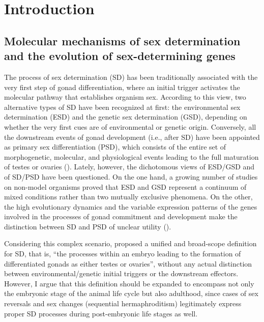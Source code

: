 \documentclass[../main.tex]{subfiles}
\begin{document}
{
\chapter{Introduction}
\label{introduction}
}

\section{Molecular mechanisms of sex determination and the evolution of sex-determining genes}
The process of sex determination (SD) has been traditionally associated with the very first step of gonad differentiation, where an initial trigger activates the molecular pathway that establishes organism sex. According to this view, two alternative types of SD have been recognized at first: the environmental sex determination (ESD) and the genetic sex determination (GSD), depending on whether the very first cues are of environmental or genetic origin. Conversely, all the downstream events of gonad development (i.e., after SD) have been appointed as primary sex differentiation (PSD), which consists of the entire set of morphogenetic, molecular, and physiological events leading to the full maturation of testes or ovaries (\textbf{\cite{uller2011origin, beukeboom2014evolution}}). Lately, however, the dichotomous views of ESD/GSD and of SD/PSD have been questioned. On the one hand, a growing number of studies on non-model organisms proved that ESD and GSD represent a continuum of mixed conditions rather than two mutually exclusive phenomena. On the other, the high evolutionary dynamics and the variable expression patterns of the genes involved in the processes of gonad commitment and development make the distinction between SD and PSD of unclear utility (\textbf{\cite{beukeboom2014evolution}}).

Considering this complex scenario, \textbf{\cite{uller2011origin}} proposed a unified and broad-scope definition for SD, that is, “the processes within an embryo leading to the formation of differentiated gonads as either testes or ovaries”, without any actual distinction between environmental/genetic initial triggers or the downstream effectors. However, I argue that this definition should be expanded to encompass not only the embryonic stage of the animal life cycle but also adulthood, since cases of sex reversals and sex changes (sequential hermaphroditism) legitimately express proper SD processes during post-embryonic life stages as well.
\end{document}
